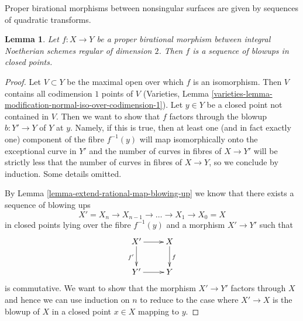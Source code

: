 \documentclass{stacks-project}
\theoremstyle{plain}
\newtheorem{lemma}[subsection]{Lemma}
\theoremstyle{definition}
\theoremstyle{remark}
\numberwithin{equation}{subsection}
\begin{document}
\noindent
Proper birational morphisms between nonsingular surfaces are given by
sequences of quadratic transforms.

\begin{lemma}
\label{lemma-proper-birational-regular-surfaces}
Let $f : X \to Y$ be a proper birational morphism between
integral Noetherian schemes regular of dimension $2$.
Then $f$ is a sequence of blowups in closed points.
\end{lemma}

\begin{proof}
Let $V \subset Y$ be the maximal open over which $f$ is an isomorphism.
Then $V$ contains all codimension $1$ points of $V$ (Varieties,
Lemma \ref{varieties-lemma-modification-normal-iso-over-codimension-1}).
Let $y \in Y$ be a closed point not contained in $V$.
Then we want to show that $f$ factors through the blowup $b : Y' \to Y$
of $Y$ at $y$. Namely, if this is true, then at least one (and in fact
exactly one) component of the fibre $f^{-1}(y)$ will map isomorphically
onto the exceptional curve in $Y'$ and the number of curves
in fibres of $X \to Y'$ will be strictly less that the number of curves
in fibres of $X \to Y$, so we conclude by induction. Some details omitted.

\medskip\noindent
By Lemma \ref{lemma-extend-rational-map-blowing-up}
we know that there exists a sequence of blowing ups
$$
X' = X_n \to X_{n - 1} \to \ldots \to X_1 \to X_0 = X
$$
in closed points lying over the fibre $f^{-1}(y)$
and a morphism $X' \to Y'$ such that
$$
\xymatrix{
X' \ar[d]_{f'} \ar[r] & X \ar[d]^f \\
Y' \ar[r] & Y
}
$$
is commutative. We want to show that the morphism $X' \to Y'$
factors through $X$ and hence we can use induction on $n$ to
reduce to the case where $X' \to X$ is the blowup of $X$
in a closed point $x \in X$ mapping to $y$.


\end{proof}
\end{document}
